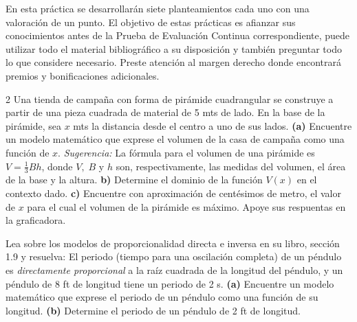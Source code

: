 \documentclass[a4 paper]{article}
\begin{document}

En esta práctica se desarrollarán siete planteamientos cada uno con una valoración de un punto. El objetivo de estas prácticas es afianzar sus conocimientos antes de la Prueba de Evaluación Continua correspondiente, puede utilizar todo el material bibliográfico a su disposición y también preguntar todo lo que considere necesario. Preste atención al margen derecho donde encontrará premios y bonificaciones adicionales.

\vspace{5mm}

\begin{paracol}{2}
 Una tienda de campaña con forma de pirámide cuadrangular se construye a partir de una pieza cuadrada de material de 5 mts de lado. En la base de la pirámide, sea $x$ mts la distancia desde el centro a uno de sus lados. \textbf{(a)} Encuentre un modelo matemático que exprese el volumen de la casa de campaña como una función de $x$. \textit{Sugerencia:} La fórmula para el volumen de una pirámide es $V = \frac{1}{3}Bh$, donde $V,\; B$ y $h$ son, respectivamente, las medidas del volumen, el área de la base y la altura. \textbf{b)} Determine el dominio de la función $V(x)$ en el contexto dado. \textbf{c)} Encuentre con aproximación de centésimos de metro, el valor de $x$ para el cual el volumen de la pirámide es máximo. Apoye sus respuentas en la graficadora.
\switchcolumn
\begin{figure}[ht]
    \centering
\end{figure}
\end{paracol}

\vskip 3mm
\solution{}
\vspace{30mm}

 Lea sobre los modelos de proporcionalidad directa e inversa en su libro, sección 1.9 y resuelva: El periodo (tiempo para una oscilación completa) de un péndulo es \textit{directamente proporcional} a la raíz cuadrada de la longitud del péndulo, y un péndulo de 8 ft de longitud tiene un periodo de 2 s. \textbf{(a)} Encuentre un modelo matemático que exprese el periodo de un péndulo como una función de su longitud. \textbf{(b)} Determine el periodo de un péndulo de 2 ft de longitud.
\end{document}
